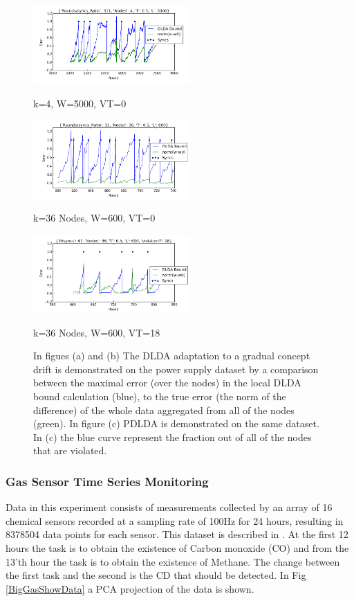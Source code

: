 \documentclass[11pt,twocolumn,varwidth=true,a4paper,fleqn]{article}
\begin{document}
\begin{figure}

\begin{minipage}[c][][t]{.5\textwidth}
  \vspace*{\fill}
  \centering
  \includegraphics[width=6cm]{PowerSupply/4nodes.png}
  \caption{k=4, W=5000, VT=0}
  \includegraphics[width=6cm]{PowerSupply/36nodes.png}
  \caption{k=36 Nodes, W=600, VT=0}
    \includegraphics[width=6cm]{PowerSupply/36nodesProb.png}
  \caption{k=36 Nodes, W=600, VT=18}
\end{minipage}
  \caption{In figues (a) and (b) The DLDA adaptation to a gradual concept drift is
demonstrated on the power supply dataset by a comparison between the maximal error (over
the nodes) in the local DLDA bound calculation (blue), to the true
error (the norm of the difference) of the whole data aggregated from
all of the nodes (green). In figure (c) PDLDA
is demonstrated on the same dataset. In (c) the blue curve represent the
fraction out of all of the nodes that are violated.}
\label{PowerSupplyFigures}
\end{figure}


\subsubsection{Gas Sensor Time Series Monitoring} 
Data in this experiment consists of measurements collected
by an array of 16 chemical sensors recorded at a sampling
rate of 100Hz for 24 hours, resulting in 8378504 data points for each sensor. 
This dataset is described in \cite{bigGas}.
At the first 12 hours the task is to obtain the existence of Carbon monoxide
(CO) and from the 13'th hour the task is to obtain the existence of Methane. The
change between the first task and the second is the CD that should be
detected. In Fig \ref{BigGasShowData} a PCA projection of the data is shown.
\end{document}

